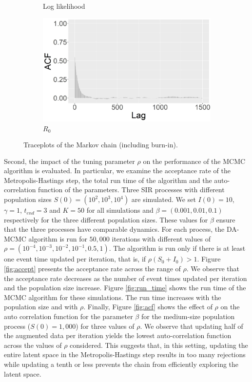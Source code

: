 \documentclass[11pt]{article}
\begin{document}
\begin{figure}
\begin{subfigure}[b]{0.41\textwidth}
			\caption{Log likelihood}
			\label{fig:traceplot_loglik}
		\end{subfigure}
		\hfill
		\begin{subfigure}[b]{0.41\textwidth}
			\centering
			\includegraphics[width=\textwidth]{E1_burn_R0_acf}
			\caption{$R_0$}
			\label{fig:traceplot_R0}
		\end{subfigure}
		\caption{Traceplots of the Markov chain (including burn-in).}
		\label{fig:traceplot}
	\end{figure}
	
	Second, the impact of the tuning parameter $\rho$ on the performance of the MCMC algorithm is evaluated. In particular, we examine the acceptance rate of the Metropolis-Hastings step, the total run time of the algorithm and the auto-correlation function of the parameters.
	Three SIR processes with different population sizes $S(0) = (10^2, 10^3, 10^4)$ are simulated. We set $I(0) =10$, $\gamma=1$, $t_{end} = 3$ and $K = 50$ for all simulations and $\beta = (0.001, 0.01, 0.1)$ respectively for the three different population sizes. These values for $\beta$ ensure that the three processes have comparable dynamics. For each process, the DA-MCMC algorithm is run for $50,000$ iterations with different values of $\rho = (10^{-4}, 10^{-3}, 10^{-2}, 10^{-1}, 0.5, 1)$. The algorithm is run only if there is at least one event time updated per iteration, that is, if $\rho(S_0+I_0)>1$.
	Figure \ref{fig:accept} presents the acceptance rate across the range of $\rho$.  We observe that the acceptance rate decreases as the number of event times updated per iteration and the population size increase.
	Figure \ref{fig:run_time} shows the run time of the MCMC algorithm for these simulations. The run time increases with the population size and with $\rho$.
	Finally, Figure \ref{fig:acf} shows the effect of $\rho$ on the auto correlation function for the parameter $\beta$ for the medium-size population process ($S(0) = 1,000$) for three values of $\rho$. We observe that updating half of the augmented data per iteration yields the lowest auto-correlation function across the values of $\rho$ considered. This suggests that, in this setting, updating the entire latent space in the Metropolis-Hastings step results in too many rejections while updating a tenth or less prevents the chain from efficiently exploring the latent space.
	
\end{document}
